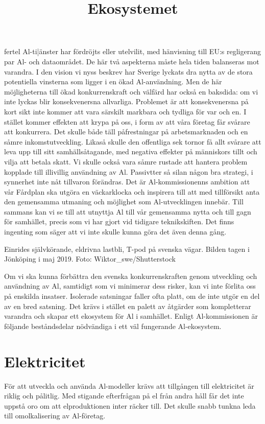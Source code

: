 {fertel Al-ti|änster har fördröjts eller utelvilit, med hänvisning till EU:s regligerang par Al- och dataområdet. De här två aspekterna måste hela tiden balanseras mot varandra.
I den vision vi nyss beskrev har Sverige lyckats dra nytta av de stora potentiella vinsterna som ligger i en ökad Al-användning. Men de här möjligheterna till ökad konkurrenskraft och välfärd har också en baksdida: om vi inte lyckas blir konsekvenersna allvarliga. Problemet är att konsekvenersna på kort sikt inte kommer att vara särskilt markbara och tydliga för var och en. I stället kommer effekten att krypa på oss, i form av att våra företag får svårare att konkurrera. Det skulle både täll påfrestningar på arbetsmarknaden och en såmre inkomstutveckling. Likaså skulle den offentliga sek tornor få allt svårare att leva upp till sitt samhällsåtagande, med negativa effekter på människors tillt och vilja att betala skatt. Vi skulle också vara såmre rustade att hantera problem kopplade till illivillig användning av Al.
Passivtter så silan någon bra strategi, i synnerhet inte nåt tillvaron förändras. Det är Al-kommissionenns ambition att vår Fårdplan ska utgöra en väckarklocka och inspirera till att med tillförsikt anta den gemensamma utmaning och möjlighet som Al-utvecklingen innebär. Till sammans kan vi se till att utnyttja Al till vår gemensamma nytta och till gagn för samhället, precis som vi har gjort vid tidigare teknikskiften. Det finns ingenting som säger att vi inte skulle kunna göra det även denna gång.

Einrides självkörande, eldrivna lastbli, T-pod på svenska vägar. Bilden tagen i Jönköping i maj 2019. Foto: Wiktor_swe/Shutterstock

\title{
Ekosystemet
}
Om vi ska kunna förbättra den svenska konkurrenskraften genom utveckling och användning av Al, samtidigt som vi minimerar dess risker, kan vi inte förlita oss på enskilda insatser. Isolerade satsningar faller ofta platt, om de inte utgör en del av en bred satsning. Det krävs i stället en palett av åtgärder som kompletterar varandra och skapar ett ekosystem för Al i samhället. Enligt Al-kommissionen är följande beståndsdelar nödvändiga i ett väl fungerande Al-ekosystem.
\section*{Elektricitet}
För att utveckla och använda Al-modeller krävs att tillgången till elektricitet är riklig och pålitlig. Med stigande efterfrågan på el från andra håll får det inte uppstå oro om att elproduktionen inter räcker till. Det skulle snabb tunkna leda till omolkalisering av Al-företag.
}
